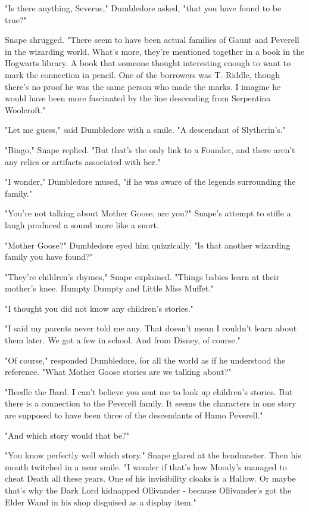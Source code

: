 \documentclass[a4paper,11pt]{article}
\begin{document}
"Is there anything, Severus," Dumbledore asked, "that you have found to be true?"

Snape shrugged. "There seem to have been actual families of Gaunt and Peverell in the wizarding world. What's more, they're mentioned together in a book in the Hogwarts library. A book that someone thought interesting enough to want to mark the connection in pencil. One of the borrowers was T. Riddle, though there's no proof he was the same person who made the marks. I imagine he would have been more fascinated by the line descending from Serpentina Woolcroft."

"Let me guess," said Dumbledore with a smile. "A descendant of Slytherin's."

"Bingo," Snape replied. "But that's the only link to a Founder, and there aren't any relics or artifacts associated with her."

"I wonder," Dumbledore mused, "if he was aware of the legends surrounding the family."

"You're not talking about Mother Goose, are you?" Snape's attempt to stifle a laugh produced a sound more like a snort.

"Mother Goose?" Dumbledore eyed him quizzically. "Is that another wizarding family you have found?"

"They're children's rhymes," Snape explained. "Things babies learn at their mother's knee. Humpty Dumpty and Little Miss Muffet."

"I thought you did not know any children's stories."

"I said my parents never told me any. That doesn't mean I couldn't learn about them later. We got a few in school. And from Disney, of course."

"Of course," responded Dumbledore, for all the world as if he understood the reference. "What Mother Goose stories are we talking about?"

"Beedle the Bard. I can't believe you sent me to look up children's stories. But there is a connection to the Peverell family. It seems the characters in one story are supposed to have been three of the descendants of Hamo Peverell."

"And which story would that be?"

"You know perfectly well which story." Snape glared at the headmaster. Then his mouth twitched in a near smile. "I wonder if that's how Moody's managed to cheat Death all these years. One of his invisibility cloaks is a Hallow. Or maybe that's why the Dark Lord kidnapped Ollivander - because Ollivander's got the Elder Wand in his shop disguised as a display item."
\end{document}
